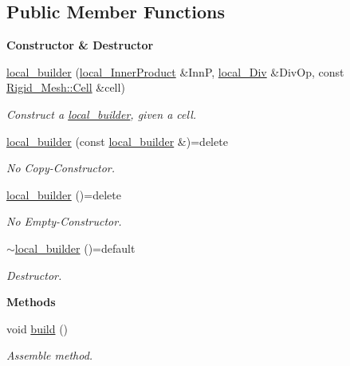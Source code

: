 \subsection*{Public Member Functions}
\begin{Indent}{\bf Constructor \& Destructor}\par
\begin{DoxyCompactItemize}
\item 
\hyperlink{classFVCode3D_1_1local__builder_aecc0f796a65099773776eba879b96f21}{local\+\_\+builder} (\hyperlink{classFVCode3D_1_1local__InnerProduct}{local\+\_\+\+Inner\+Product} \&InnP, \hyperlink{classFVCode3D_1_1local__Div}{local\+\_\+\+Div} \&Div\+Op, const \hyperlink{classFVCode3D_1_1Rigid__Mesh_1_1Cell}{Rigid\+\_\+\+Mesh\+::\+Cell} \&cell)
\begin{DoxyCompactList}\small\item\em Construct a \hyperlink{classFVCode3D_1_1local__builder}{local\+\_\+builder}, given a cell. \end{DoxyCompactList}\item 
\hyperlink{classFVCode3D_1_1local__builder_a768fba92ec63d9c4577ff0a76a0558e5}{local\+\_\+builder} (const \hyperlink{classFVCode3D_1_1local__builder}{local\+\_\+builder} \&)=delete
\begin{DoxyCompactList}\small\item\em No Copy-\/\+Constructor. \end{DoxyCompactList}\item 
\hyperlink{classFVCode3D_1_1local__builder_a79217d32fae18847e1890129a2ed0b18}{local\+\_\+builder} ()=delete
\begin{DoxyCompactList}\small\item\em No Empty-\/\+Constructor. \end{DoxyCompactList}\item 
\hyperlink{classFVCode3D_1_1local__builder_a71e14018c10f4cc922727bf74c36871a}{$\sim$local\+\_\+builder} ()=default
\begin{DoxyCompactList}\small\item\em Destructor. \end{DoxyCompactList}\end{DoxyCompactItemize}
\end{Indent}
\begin{Indent}{\bf Methods}\par
\begin{DoxyCompactItemize}
\item 
void \hyperlink{classFVCode3D_1_1local__builder_a4f57be493ef2a52f37a898855c3e4d66}{build} ()
\begin{DoxyCompactList}\small\item\em Assemble method. \end{DoxyCompactList}\end{DoxyCompactItemize}
\end{Indent}
